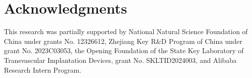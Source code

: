 \section{Acknowledgments}
This research was partially supported by National Natural Science Foundation of China under grants No. 12326612, Zhejiang Key R\&D Program of China under grant No. 2023C03053, the Opening Foundation of the State Key Laboratory of Transvascular Implantation Devices, grant No. SKLTID2024003, and Alibaba Research Intern Program.

\clearpage

